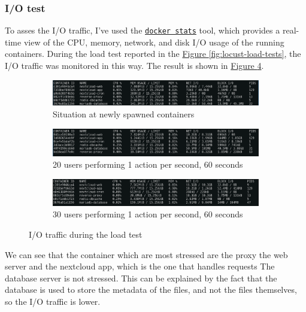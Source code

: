 \subsubsection{I/O test}
\label{subsubsec:test}

To asses the I/O traffic, I've used the \href{https://docs.docker.com/config/containers/runmetrics/}{\texttt{docker stats}} tool, which provides a real-time view of the CPU, memory, network, and disk I/O usage of the running containers.
During the load test reported in the \hyperref[fig:locust-load-tests]{Figure \ref{fig:locust-load-tests}}, the I/O traffic was monitored in this way. The result is shown in \hyperref[fig:docker-stats]{Figure \ref{fig:docker-stats}}.

\begin{figure}[H]
    \centering
    \begin{subfigure}{\textwidth}
        \includegraphics[width=\linewidth]{./images/ex1/newspawedIO}
        \caption{Situation at newly spawned containers}
        \label{fig:newspawedIO}
    \end{subfigure}
    \begin{subfigure}{\textwidth}
        \includegraphics[width=\linewidth]{./images/ex1/20usersIO}
        \caption{20 users performing 1 action per second, 60 seconds}
        \label{fig:20usersIO}
    \end{subfigure}
    \begin{subfigure}{\textwidth}
        \includegraphics[width=\linewidth]{./images/ex1/30usersIO}
        \caption{30 users performing 1 action per second, 60 seconds}
        \label{fig:30usersIO}
    \end{subfigure}
    \caption{I/O traffic during the load test}
    \label{fig:docker-stats}
\end{figure}

We can see that the container which are most stressed are the proxy the web server and the nextcloud app, which is the one that handles requests
The database server is not stressed. This can be explained by the fact that the database is used to store the metadata of the files, and not the files themselves, so the I/O traffic is lower. 

